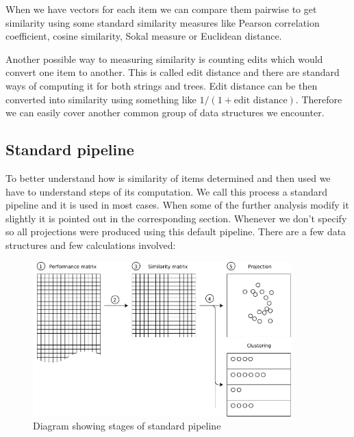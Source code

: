 \documentclass[
  digital, %
  table,   %
  nolof,     %
  nolot,     %
  nocover,
  color,
  final, %
]{fithesis3}
\begin{document}
When we have vectors for each item we can compare them pairwise to get similarity using some standard similarity measures like Pearson correlation coefficient, cosine similarity, Sokal measure or Euclidean distance.


Another possible way to measuring similarity is counting edits which would convert one item to another. This is called edit distance and there are standard ways of computing it for both strings and trees. Edit distance can be then converted into similarity using something like $1 / (1 + \text{edit distance})$. Therefore we can easily cover another common group of data structures we encounter.


\subsection{Standard pipeline}\label{standard-pipeline}


To better understand how is similarity of items determined and then used we have to understand steps of its computation. We call this process a standard pipeline and it is used in most cases. When some of the further analysis modify it slightly it is pointed out in the corresponding section. Whenever we don't specify so all projections were produced using this default pipeline. There are a few data structures and few calculations involved:

\begin{figure}
  \includegraphics[width=10cm]{img/pipeline_diagram}
  \caption{Diagram showing stages of standard pipeline}
  \label{fig:pipeline_diagram}
\end{figure}
\end{document}
